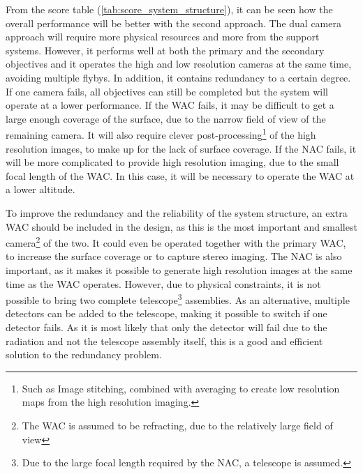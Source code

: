 From the score table (\ref{tab:score_system_structure}), it can be seen how the overall performance will be better with the second approach. The dual camera approach will require more physical resources and more from the support systems. However, it performs well at both the primary and the secondary objectives and it operates the high and low resolution cameras at the same time, avoiding multiple flybys. In addition, it contains redundancy to a certain degree. If one camera fails, all objectives can still be completed but the system will operate at a lower performance. If the WAC fails, it may be difficult to get a large enough coverage of the surface, due to the narrow field of view of the remaining camera. It will also require clever post-processing\footnote{Such as Image stitching, combined with averaging to create low resolution maps from the high resolution imaging.} of the high resolution images, to make up for the lack of surface coverage. If the NAC fails, it will be more complicated to provide high resolution imaging, due to the small focal length of the WAC. In this case, it will be necessary to operate the WAC at a lower altitude.

To improve the redundancy and the reliability of the system structure, an extra WAC should be included in the design, as this is the most important and smallest camera\footnote{The WAC is assumed to be refracting, due to the relatively large field of view} of the two. It could even be operated together with the primary WAC, to increase the surface coverage or to capture stereo imaging. The NAC is also important, as it makes it possible to generate high resolution images at the same time as the WAC operates. However, due to physical constraints, it is not possible to bring two complete telescope\footnote{Due to the large focal length required by the NAC, a telescope is assumed.} assemblies. As an alternative, multiple detectors can be added to the telescope, making it possible to switch if one detector fails. As it is most likely that only the detector will fail due to the radiation and not the telescope assembly itself, this is a good and efficient solution to the redundancy problem. 
